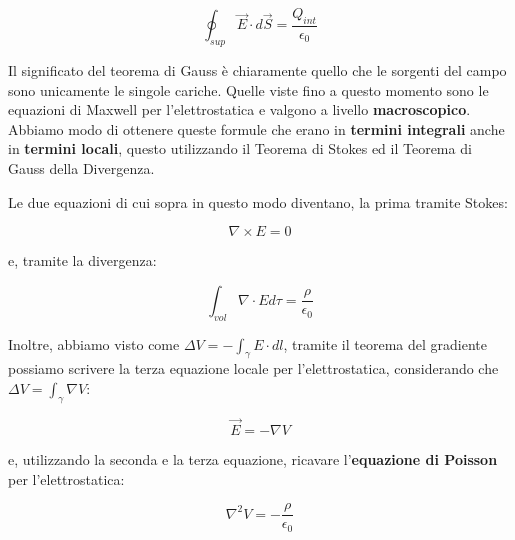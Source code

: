 \begin{equation}
	\oint_{sup} \vec{E} \cdot d\vec{S} = \frac{Q_{int}}{\epsilon_0}
\end{equation}

Il significato del teorema di Gauss è chiaramente quello che le sorgenti del campo sono unicamente le singole cariche. Quelle viste fino a questo momento sono le equazioni di Maxwell per l'elettrostatica e valgono a livello \textbf{macroscopico}. Abbiamo modo di ottenere queste formule che erano in \textbf{termini integrali} anche in \textbf{termini locali}, questo utilizzando il Teorema di Stokes ed il Teorema di Gauss della Divergenza. 


Le due equazioni di cui sopra in questo modo diventano, la prima tramite Stokes: 

$$
\nabla \times E = 0
$$

e, tramite la divergenza:

$$
\int_{vol} \nabla \cdot E d\tau = \frac{\rho}{\epsilon_0}
$$

Inoltre, abbiamo visto come $\Delta V = - \int_\gamma E \cdot dl$, tramite il teorema del gradiente possiamo scrivere la terza equazione locale per l'elettrostatica, considerando che $\Delta V = \int_\gamma \nabla V$: 

$$ \vec{E} = - \nabla V $$

e, utilizzando la seconda e la terza equazione, ricavare l'\textbf{equazione di Poisson} per l'elettrostatica: 

$$ \nabla^2 V = -\frac{\rho}{\epsilon_0} $$